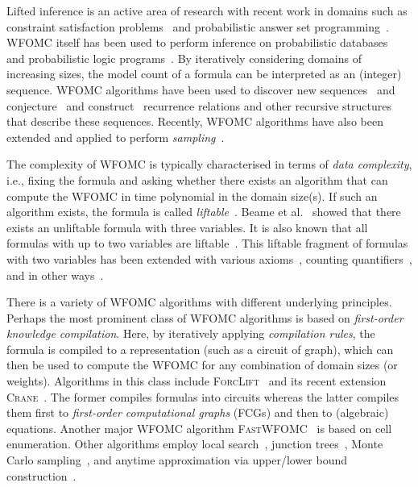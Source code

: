 \documentclass{article}
\theoremstyle{remark}
\begin{document}
Lifted inference is an active area of research with recent work in domains such
as constraint satisfaction problems~\cite{DBLP:journals/jair/TotisDRK23} and
probabilistic answer set programming~\cite{DBLP:journals/ijar/AzzoliniR23}.
WFOMC itself has been used to perform inference on probabilistic
databases~\cite{DBLP:journals/debu/GribkoffSB14} and probabilistic logic
programs~\cite{DBLP:journals/ijar/RiguzziBZCL17}. By iteratively considering
domains of increasing sizes, the model count of a formula can be interpreted as
an (integer) sequence. WFOMC algorithms have been used to discover new
sequences~\cite{DBLP:conf/ijcai/SvatosJT0K23} and
conjecture~\cite{DBLP:conf/ilp/BarvinekB0ZK21} and
construct~\cite{DBLP:conf/kr/DilkasB23} recurrence relations and other recursive
structures that describe these sequences. Recently, WFOMC algorithms have also
been extended and applied to perform
\emph{sampling}~\cite{DBLP:conf/aaai/WangB0K22,DBLP:conf/lics/WangP0K23}.


The complexity of WFOMC is typically characterised in terms of \emph{data
  complexity}, i.e., fixing the formula and asking whether there exists an
algorithm that can compute the WFOMC in time polynomial in the domain size(s).
If such an algorithm exists, the formula is called
\emph{liftable}~\cite{DBLP:conf/starai/JaegerB12}. Beame et
al.~ showed that there exists an unliftable
formula with three variables. It is also known that all formulas with up to two
variables are liftable~\cite{DBLP:conf/nips/Broeck11,DBLP:conf/kr/BroeckMD14}.
This liftable fragment of formulas with two variables has been extended with
various axioms~\cite{DBLP:conf/aaai/TothK23,DBLP:journals/ai/BremenK23},
counting quantifiers~\cite{DBLP:journals/jair/Kuzelka21}, and in other
ways~\cite{DBLP:conf/nips/KazemiKBP16}.


There is a variety of WFOMC algorithms with different underlying principles.
Perhaps the most prominent class of WFOMC algorithms is based on
\emph{first-order knowledge compilation}. Here, by iteratively applying
\emph{compilation rules}, the formula is compiled to a representation (such as a
circuit of graph), which can then be used to compute the WFOMC for any
combination of domain sizes (or weights). Algorithms in this class include
\textsc{ForcLift}~\cite{DBLP:conf/ijcai/BroeckTMDR11} and its recent extension
\textsc{Crane}~\cite{DBLP:conf/kr/DilkasB23}. The former compiles formulas into
circuits whereas the latter compiles them first to \emph{first-order
  computational graphs} (FCGs) and then to (algebraic) equations. Another major
WFOMC algorithm \textsc{FastWFOMC}~\cite{DBLP:conf/uai/BremenK21} is based on
cell enumeration. Other algorithms employ local
search~\cite{DBLP:journals/pvldb/NiuRDS11}, junction
trees~\cite{DBLP:conf/aaai/VenugopalSG15}, Monte Carlo
sampling~\cite{DBLP:journals/cacm/GogateD16}, and anytime approximation via
upper/lower bound construction~\cite{DBLP:conf/ijcai/BremenK20}.
\end{document}
